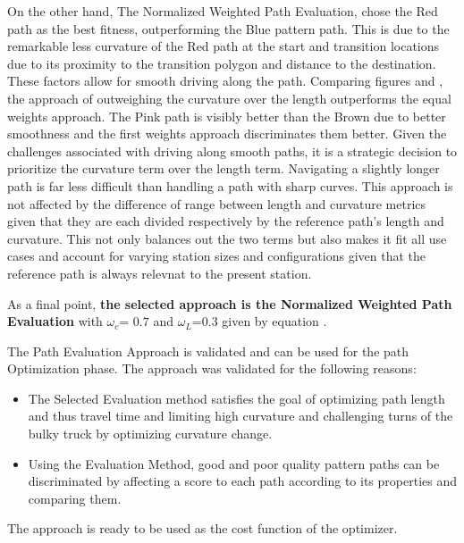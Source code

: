 \noindent On the other hand, The Normalized Weighted Path Evaluation, chose the Red path as the best fitness, 
outperforming the Blue pattern path. This is due to the remarkable less curvature of the Red path at the start 
and transition locations due to its proximity to the transition polygon and distance to the destination.
These factors allow for smooth driving along the path.
Comparing figures  and , the approach of outweighing the curvature 
over the length outperforms the equal weights approach. The Pink path is visibly better than the Brown due 
to better smoothness and the first weights approach discriminates them better. 
Given the challenges associated with driving along smooth paths, it is a strategic decision to prioritize the 
curvature term over the length term. Navigating a slightly longer path is far less difficult than handling a path 
with sharp curves.
This approach is not affected by the difference of range between length and curvature metrics given that 
they are each divided respectively by the reference path's length and curvature. This not only balances out the 
two terms but also makes it fit all use cases and account for varying station sizes and configurations given that 
the reference path is always relevnat to the present station.

As a final point, \textbf{the selected approach is the Normalized Weighted Path Evaluation} with \(\omega_c\)= \(0.7\) 
and \(\omega_L\)=\(0.3\) given by equation .

The Path Evaluation Approach is validated and can be used for the path Optimization phase.
The approach was validated for the following reasons: 
\begin{itemize}
    \item The Selected Evaluation method satisfies the goal of optimizing path length and thus travel time
    and limiting high curvature and challenging turns of the bulky truck by optimizing curvature change.
    \item Using the Evaluation Method, good and poor quality pattern paths can be discriminated by 
    affecting a score to each path according to its properties and comparing them.
\end{itemize}

The approach is ready to be used as the cost function of the optimizer.

